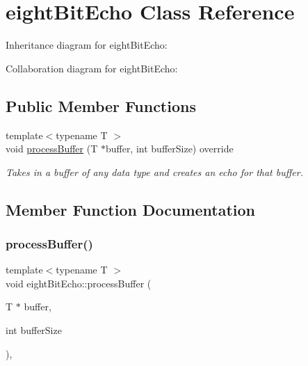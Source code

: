 \hypertarget{classeightBitEcho}{}\section{eight\+Bit\+Echo Class Reference}
\label{classeightBitEcho}


Inheritance diagram for eight\+Bit\+Echo\+:


Collaboration diagram for eight\+Bit\+Echo\+:
\subsection*{Public Member Functions}
\begin{DoxyCompactItemize}
\item 
{\footnotesize template$<$typename T $>$ }\\void \hyperlink{classeightBitEcho_aae8b9ddf8b8688f25abe899f7e3b9650}{process\+Buffer} (T $\ast$buffer, int buffer\+Size) override
\begin{DoxyCompactList}\small\item\em Takes in a buffer of any data type and creates an echo for that buffer. \end{DoxyCompactList}\end{DoxyCompactItemize}


\subsection{Member Function Documentation}
\mbox{\label{classeightBitEcho_aae8b9ddf8b8688f25abe899f7e3b9650}} 
\subsubsection{\texorpdfstring{process\+Buffer()}{processBuffer()}}
{\footnotesize\ttfamily template$<$typename T $>$ \\
void eight\+Bit\+Echo\+::process\+Buffer (\begin{DoxyParamCaption}\item[{T $\ast$}]{buffer,  }\item[{int}]{buffer\+Size }\end{DoxyParamCaption})\hspace{0.3cm}{\ttfamily [inline]}, {\ttfamily [override]}}



